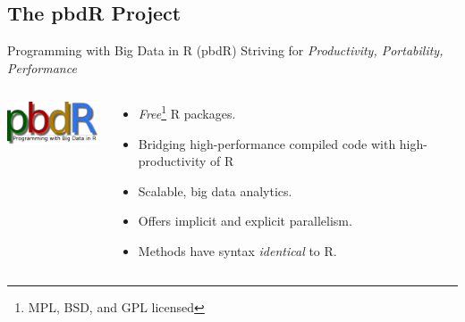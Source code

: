 \subsection{The pbdR Project}
\makesubcontentsslidessec


\begin{frame}
  \begin{block}{Programming with Big Data in R (pbdR)}
       \centering Striving for \emph{Productivity, Portability, Performance}\\[.4cm]\pause
  \begin{columns}[onlytextwidth]
    \begin{column}{0.30\textwidth}
      \centering
       \includegraphics[width=3.4cm]{../common/pics/simple}\\[.2cm]
    \end{column}
    \begin{column}{0.65\textwidth}
  \begin{itemize}[<+-|alert@+>]
    \item \emph{Free}\footnote{MPL, BSD, and GPL licensed} R packages.
    \item Bridging high-performance compiled code with high-productivity of R
    \item Scalable, big data analytics.
    \item Offers implicit and explicit parallelism.
    \item Methods have syntax \emph{identical} to R.
  \end{itemize}
    \end{column}
​  \end{columns}
\end{block}
\end{frame}




